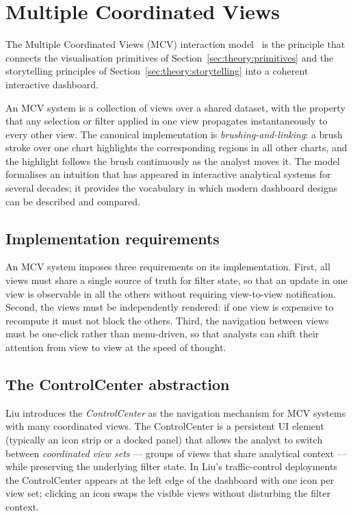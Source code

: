 \section{Multiple Coordinated Views}
\label{sec:theory:mcv}

The Multiple Coordinated Views (MCV) interaction
model~\cite{liu2022} is the principle that connects the
visualisation primitives of Section~\ref{sec:theory:primitives}
and the storytelling principles of
Section~\ref{sec:theory:storytelling} into a coherent
interactive dashboard.

An MCV system is a collection of views over a shared dataset,
with the property that any selection or filter applied in one
view propagates instantaneously to every other view. The
canonical implementation is \emph{brushing-and-linking}: a
brush stroke over one chart highlights the corresponding
regions in all other charts, and the highlight follows the
brush continuously as the analyst moves it. The model
formalises an intuition that has appeared in interactive
analytical systems for several decades; it provides the
vocabulary in which modern dashboard designs can be described
and compared.

\subsection{Implementation requirements}

An MCV system imposes three requirements on its implementation.
First, all views must share a single source of truth for filter
state, so that an update in one view is observable in all the
others without requiring view-to-view notification. Second,
the views must be independently rendered: if one view is
expensive to recompute it must not block the others. Third,
the navigation between views must be one-click rather than
menu-driven, so that analysts can shift their attention from
view to view at the speed of thought.

\subsection{The ControlCenter abstraction}

Liu introduces the \emph{ControlCenter} as the navigation
mechanism for MCV systems with many coordinated views. The
ControlCenter is a persistent UI element (typically an icon
strip or a docked panel) that allows the analyst to switch
between \emph{coordinated view sets} --- groups of views that
share analytical context --- while preserving the underlying
filter state. In Liu's traffic-control deployments the
ControlCenter appears at the left edge of the dashboard with
one icon per view set; clicking an icon swaps the visible
views without disturbing the filter context.

